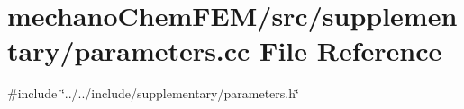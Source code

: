\section{mechano\+Chem\+F\+E\+M/src/supplementary/parameters.cc File Reference}
\label{parameters_8cc}
{\ttfamily \#include \char`\"{}../../include/supplementary/parameters.\+h\char`\"{}}\newline
